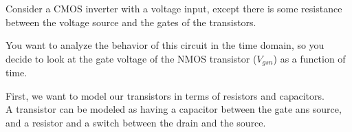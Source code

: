 

Consider a CMOS inverter with a voltage input, except there is some resistance between the voltage source and the gates of the transistors.



You want to analyze the behavior of this circuit in the time domain, so you decide to look at the gate voltage of the NMOS transistor ($V_{gsn}$) as a function of time.

\begin{enumerate}

\qitem First, we want to model our transistors in terms of resistors and capacitors. \\
A transistor can be modeled as having a capacitor between the gate ans source, and a resistor and a switch between the drain and the source.

\end{enumerate}
